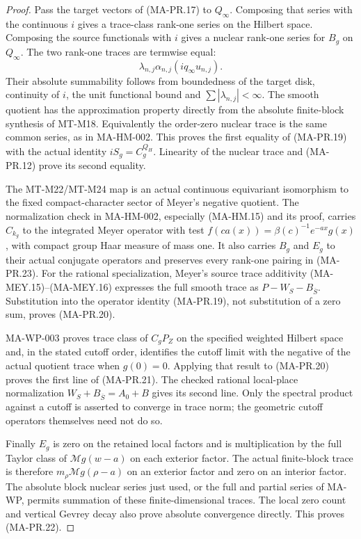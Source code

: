 \begin{proof}
Pass the target vectors of (MA-PR.17) to $Q_\infty$.
Composing that series with the continuous $i$ gives
a trace-class rank-one series on the Hilbert space.
Composing the source functionals with $i$ gives a
nuclear rank-one series for $B_g$ on $Q_\infty$.
The two rank-one traces are termwise equal:
\[
 \lambda_{n,j}\alpha_{n,j}
                       (i q_\infty u_{n,j}).
\tag{MA-PR.23}
\]
Their absolute summability follows from boundedness
of the target disk, continuity of $i$, the unit
functional bound and $\sum|\lambda_{n,j}|<\infty$.
The smooth quotient has the approximation property
directly from the absolute finite-block synthesis
of MT-M18.  Equivalently the order-zero nuclear
trace is the same common series, as in MA-HM-002.
This proves the first equality of (MA-PR.19) with
the actual identity $iS_g=C_g^{Q_H}$.
Linearity of the nuclear trace and (MA-PR.12)
prove its second equality.

The MT-M22/MT-M24 map is an actual continuous
equivariant isomorphism to the fixed compact-character
sector of Meyer's negative quotient.
The normalization check in MA-HM-002, especially
(MA-HM.15) and its proof, carries $C_{k_g}$ to the
integrated Meyer operator with test
$f(ca(x))=\beta(c)^{-1}e^{-ax}g(x)$, with compact
group Haar measure of mass one.
It also carries $B_g$ and $E_g$ to their actual
conjugate operators and preserves every rank-one
pairing in (MA-PR.23).
For the rational specialization, Meyer's source
trace additivity (MA-MEY.15)--(MA-MEY.16) expresses
the full smooth trace as $P-W_S-B_{\overline S}$.
Substitution into the operator identity (MA-PR.19),
not substitution of a zero sum, proves (MA-PR.20).

MA-WP-003 proves trace class of $C_gP_Z$ on the
specified weighted Hilbert space and, in the stated
cutoff order, identifies the cutoff limit with the
negative of the actual quotient trace when $g(0)=0$.
Applying that result to (MA-PR.20) proves the first
line of (MA-PR.21).
The checked rational local-place normalization
$W_S+B_{\overline S}=A_0+B$ gives its second line.
Only the spectral product against a cutoff is
asserted to converge in trace norm; the geometric
cutoff operators themselves need not do so.

Finally $E_g$ is zero on the retained local factors
and is multiplication by the full Taylor class of
$\mathcal Mg(w-a)$ on each exterior factor.
The actual finite-block trace is therefore
$m_\rho\mathcal Mg(\rho-a)$ on an exterior factor
and zero on an interior factor.
The absolute block nuclear series just used, or
the full and partial series of MA-WP, permits
summation of these finite-dimensional traces.
The local zero count and vertical Gevrey decay
also prove absolute convergence directly.
This proves (MA-PR.22).
\end{proof}

